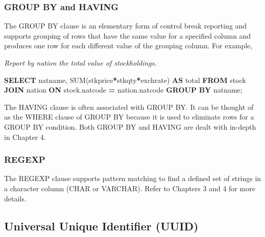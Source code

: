 \documentclass[
]{article}
\newenvironment{Shaded}{\begin{snugshade}}{\end{snugshade}}
\newcommand{\FunctionTok}[1]{\textcolor[rgb]{0.00,0.00,0.00}{#1}}
\newcommand{\KeywordTok}[1]{\textcolor[rgb]{0.13,0.29,0.53}{\textbf{#1}}}
\newcommand{\NormalTok}[1]{#1}
\newcommand{\OperatorTok}[1]{\textcolor[rgb]{0.81,0.36,0.00}{\textbf{#1}}}
\begin{document}
\hypertarget{group-by-and-having}{%
\subsubsection*{GROUP BY and HAVING}\label{group-by-and-having}}

The GROUP BY clause is an elementary form of control break reporting and
supports grouping of rows that have the same value for a specified
column and produces one row for each different value of the grouping
column. For example,

\emph{Report by nation the total value of stockholdings.}

\begin{Shaded}
\begin{Highlighting}[]
\KeywordTok{SELECT}\NormalTok{ natname, }\FunctionTok{SUM}\NormalTok{(stkprice}\OperatorTok{*}\NormalTok{stkqty}\OperatorTok{*}\NormalTok{exchrate) }\KeywordTok{AS}\NormalTok{ total}
    \KeywordTok{FROM}\NormalTok{ stock }\KeywordTok{JOIN}\NormalTok{ nation }\KeywordTok{ON}\NormalTok{ stock.natcode }\OperatorTok{=}\NormalTok{ nation.natcode}
        \KeywordTok{GROUP} \KeywordTok{BY}\NormalTok{ natname;}
\end{Highlighting}
\end{Shaded}

The HAVING clause is often associated with GROUP BY. It can be thought
of as the WHERE clause of GROUP BY because it is used to eliminate rows
for a GROUP BY condition. Both GROUP BY and HAVING are dealt with
in-depth in Chapter 4.

\hypertarget{regexp}{%
\subsubsection*{REGEXP}\label{regexp}}

The REGEXP clause supports pattern matching to find a defined set of
strings in a character column (CHAR or VARCHAR). Refer to Chapters 3 and
4 for more details.

\hypertarget{universal-unique-identifier-uuid}{%
\subsection*{Universal Unique Identifier
(UUID)}\label{universal-unique-identifier-uuid}}
\end{document}
